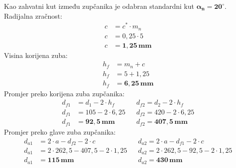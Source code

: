 \documentclass[11pt,a4paper]{report}
\begin{document}
Kao zahvatni kut između zupčanika je odabran standardni kut $\mathbf{\alpha_n=20^\circ}$.
Radijalna zračnost:
\begin{align*}
c&=c^* \cdot m_n\\
c&=0,25 \cdot 5\\
c&= \mathbf{1,25 \, mm}
\end{align*}
Visina korijena zuba:
\begin{align*}
h_f&=m_n+c\\
h_f&=5+1,25\\
h_f&=\mathbf{6,25 \,mm}
\end{align*}
Promjer preko korijena zuba zupčanika:
\begin{align*}
d_{f1}&=d_1-2 \cdot h_f && d_{f2}=d_2-2 \cdot h_f\\
d_{f1}&=105-2 \cdot 6,25 && d_{f2}=420-2 \cdot 6,25\\
d_{f1}&=\mathbf{92,5 \,mm} && d_{f2}=\mathbf{407,5 \,mm}
\end{align*}
Promjer preko glave zuba zupčanika:
\begin{align*}
d_{a1}&=2 \cdot a - d_{f2} - 2 \cdot c  && d_{a2}=2 \cdot a - d_{f1} - 2 \cdot c\\
d_{a1}&=2 \cdot 262,5 - 407,5 - 2 \cdot 1,25 && d_{a2}=2 \cdot 262,5 - 92,5 - 2 \cdot 1,25\\
d_{a1}&=\mathbf{115 \,mm} && d_{a2}=\mathbf{430 \,mm}
\end{align*}
\end{document}
